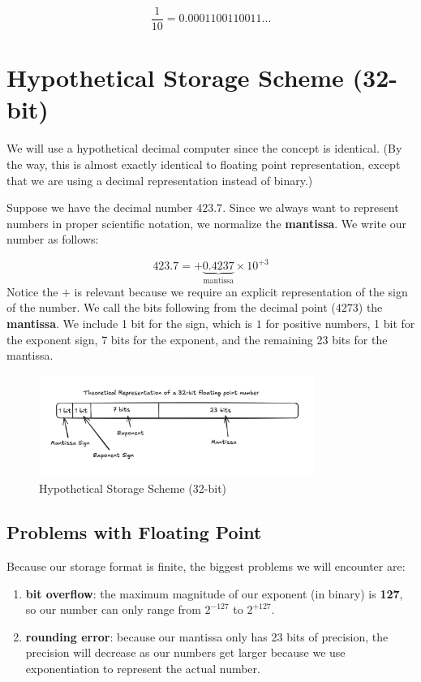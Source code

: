 \begin{equation*}
  \frac{1}{10} = 0.0001100110011\dots
\end{equation*}

\section{Hypothetical Storage Scheme (32-bit)}

We will use a hypothetical decimal computer since the concept is identical.
(By the way, this is almost exactly identical to 
 floating point
representation, except that we are using a decimal representation instead of
binary.)

Suppose we have the decimal number $423.7$. Since we always want to represent
numbers in proper scientific notation, we normalize the
\textbf{mantissa}.
We write our number as follows:

\begin{equation*}
  423.7 = +\underbrace{0.4237}_{\text{mantissa}} \times 10^{+3}
\end{equation*}
Notice the $+$ is relevant because we require an explicit representation of the
sign of the number. We call the bits following from the decimal point ($4273$) 
the \textbf{mantissa}.
We include 1 bit for the sign, which is $1$ for positive numbers, 1 bit for the
exponent sign, 7 bits for the exponent, and the remaining 23 bits for the
mantissa.

\begin{figure}[h]
  \centering
  \includegraphics[width=0.8\textwidth]{./assets/fake_ieee754.png}
  \caption{Hypothetical Storage Scheme (32-bit)}
\end{figure}

\subsection{Problems with Floating Point}
\noindent
\begin{minipage}{\textwidth}
Because our storage format is finite, the biggest problems we will encounter
are:
\begin{enumerate}
  \item \textbf{bit overflow}: the maximum magnitude of our exponent (in binary)
    is \textbf{127}, so our number can only range from $2^{-127}$ to $2^{+127}$.
  \item \textbf{rounding error}: because our mantissa only has 23 bits of 
    precision, the precision will decrease as our numbers get larger because we 
    use exponentiation to represent the actual number.
\end{enumerate}
\end{minipage}

